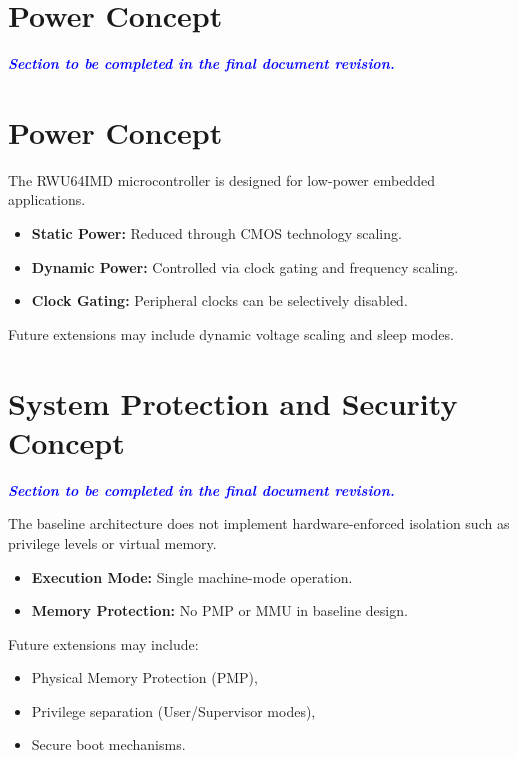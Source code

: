 \section{Power Concept}

\textcolor{blue}{\textbf{\textit{Section to be completed in the final document revision.}}}

\section{Power Concept}

The RWU64IMD microcontroller is designed for low-power embedded applications.

\begin{itemize}
    \item \textbf{Static Power:} Reduced through CMOS technology scaling.
    \item \textbf{Dynamic Power:} Controlled via clock gating and frequency scaling.
    \item \textbf{Clock Gating:} Peripheral clocks can be selectively disabled.
\end{itemize}

Future extensions may include dynamic voltage scaling and sleep modes.


\section{System Protection and Security Concept}

\textcolor{blue}{\textbf{\textit{Section to be completed in the final document revision.}}}

The baseline architecture does not implement hardware-enforced isolation such
as privilege levels or virtual memory.

\begin{itemize}
    \item \textbf{Execution Mode:} Single machine-mode operation.
    \item \textbf{Memory Protection:} No PMP or MMU in baseline design.
\end{itemize}

Future extensions may include:
\begin{itemize}
    \item Physical Memory Protection (PMP),
    \item Privilege separation (User/Supervisor modes),
    \item Secure boot mechanisms.
\end{itemize}



